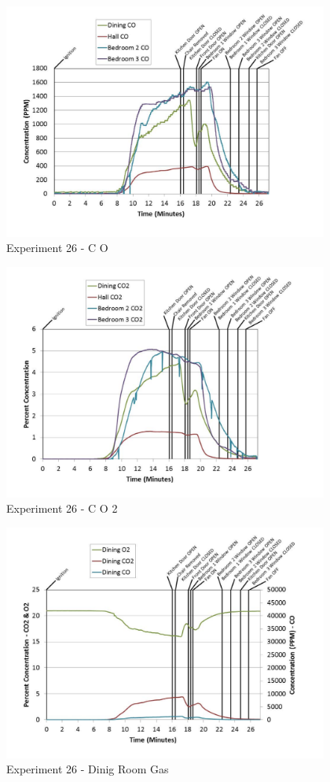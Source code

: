 \documentclass{article}
\begin{document}
\begin{appendices}
	\begin{figure}[h!]
		\centering
		\includegraphics[height=3.05in]{0_Images/Results_Charts/Exp_26_Charts/CO.pdf}
		\caption{Experiment 26 - C O}
	\end{figure}
 
	\clearpage

	\begin{figure}[h!]
		\centering
		\includegraphics[height=3.05in]{0_Images/Results_Charts/Exp_26_Charts/CO2.pdf}
		\caption{Experiment 26 - C O 2}
	\end{figure}
 

	\begin{figure}[h!]
		\centering
		\includegraphics[height=3.05in]{0_Images/Results_Charts/Exp_26_Charts/DinigRoomGas.pdf}
		\caption{Experiment 26 - Dinig Room Gas}
	\end{figure}
 

\end{appendices}
\end{document}
